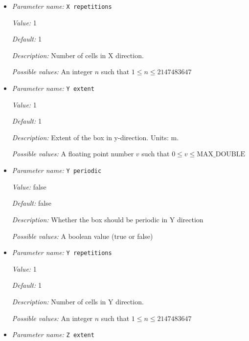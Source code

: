 \begin{itemize}
{\it Value:} false


{\it Default:} false


{\it Description:} Whether the box should be periodic in X direction


{\it Possible values:} A boolean value (true or false)
\item {\it Parameter name:} {\tt X repetitions}
\label{parameters:Geometry model/Box/X repetitions}


{\it Value:} 1


{\it Default:} 1


{\it Description:} Number of cells in X direction.


{\it Possible values:} An integer $n$ such that $1\leq n \leq 2147483647$
\item {\it Parameter name:} {\tt Y extent}
\label{parameters:Geometry model/Box/Y extent}


{\it Value:} 1


{\it Default:} 1


{\it Description:} Extent of the box in y-direction. Units: m.


{\it Possible values:} A floating point number $v$ such that $0 \leq v \leq \text{MAX\_DOUBLE}$
\item {\it Parameter name:} {\tt Y periodic}
\label{parameters:Geometry model/Box/Y periodic}


{\it Value:} false


{\it Default:} false


{\it Description:} Whether the box should be periodic in Y direction


{\it Possible values:} A boolean value (true or false)
\item {\it Parameter name:} {\tt Y repetitions}
\label{parameters:Geometry model/Box/Y repetitions}


{\it Value:} 1


{\it Default:} 1


{\it Description:} Number of cells in Y direction.


{\it Possible values:} An integer $n$ such that $1\leq n \leq 2147483647$
\item {\it Parameter name:} {\tt Z extent}
\label{parameters:Geometry model/Box/Z extent}



\end{itemize}
